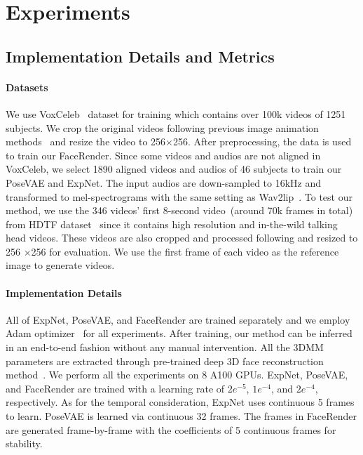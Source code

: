 \section{Experiments}
\label{Experiments}

\subsection{Implementation Details and Metrics}
\label{Details}



\paragraph{Datasets} We use VoxCeleb~\cite{voxceleb} dataset for training which contains over 100k videos of 1251 subjects. We crop the original videos following previous image animation methods~\cite{fomm} and resize the video to 256$\times$256. After preprocessing, the data is used to train our FaceRender. Since some videos and audios are not aligned in VoxCeleb, we select 1890 aligned videos and audios of 46 subjects to train our PoseVAE and ExpNet. The input audios are down-sampled to 16kHz and transformed to mel-spectrograms with the same setting as Wav2lip~\cite{wav2lip}. To test our method, we use the 346 videos' first 8-second video~(around 70k frames in total) from HDTF dataset~\cite{hdtf} since it contains high resolution and in-the-wild talking head videos. These videos are also cropped and processed following \cite{fomm} and resized to 256 $\times$256 for evaluation. We use the first frame of each video as the reference image to generate videos.

\paragraph{Implementation Details} All of ExpNet, PoseVAE, and FaceRender are trained separately and we employ Adam optimizer~\cite{adam} for all experiments. After training, our method can be inferred in an end-to-end fashion without any manual intervention. All the 3DMM parameters are extracted through pre-trained deep 3D face reconstruction method~\cite{deng2019accurate}. We perform all the experiments on 8 A100 GPUs. ExpNet, PoseVAE, and FaceRender are trained with a learning rate of $2e^{-5}$, $1e^{-4}$, and $2e^{-4}$, respectively. As for the temporal consideration, ExpNet uses continuous 5 frames to learn. PoseVAE is learned via  continuous 32 frames. The frames in FaceRender are generated frame-by-frame with the coefficients of 5 continuous frames for stability.


